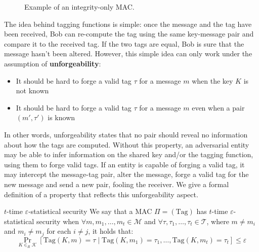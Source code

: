 \documentclass[a4paper, 12pt]{report}
\begin{document}
    \begin{figure}[H]
        \centering


        \caption{Example of an integrity-only MAC.}
    \end{figure}

    The idea behind tagging functions is simple: once the message and the tag have been received, Bob can re-compute the tag using the same key-message pair and compare it to the received tag. If the two tags are equal, Bob is sure that the message hasn't been altered. However, this simple idea can only work under the assumption of \textbf{unforgeability}: 
    \begin{itemize}
        \item It should be hard to forge a valid tag $\tau$ for a message $m$ when the key $K$ is not known
        \item It should be hard to forge a valid tag $\tau$ for a message $m$ even when a pair $(m',\tau')$ is known
    \end{itemize}

    In other words, unforgeability states that no pair should reveal no information about how the tags are computed. Without this property, an adversarial entity may be able to infer information on the shared key and/or the tagging function, using them to forge valid tags. If an entity is capable of forging a valid tag, it may intercept the message-tag pair, alter the message, forge a valid tag for the new message and send a new pair, fooling the receiver. We give a formal definition of a property that reflects this unforgeability aspect.

    \begin{frameddefn}{$t$-time $\varepsilon$-statistical security}
        We say that a MAC $\Pi = (\mathrm{Tag})$ has $t$-time $\varepsilon$-statistical security when $\forall m, m_1, \ldots, m_t \in \mathcal{M}$ and $\forall \tau, \tau_1,\ldots, \tau_t \in\mathcal{T}$, where $m \neq m_i$ and $m_i \neq m_j$ for each $i \neq j$, it holds that:
        \[\Pr_{K \in_R \mathcal{K}} [\mathrm{Tag}(K,m) = \tau \mid \mathrm{Tag}(K,m_1) = \tau_1, \ldots, \mathrm{Tag}(K,m_t) = \tau_t] \leq \varepsilon\]
    \end{frameddefn}
\end{document}
